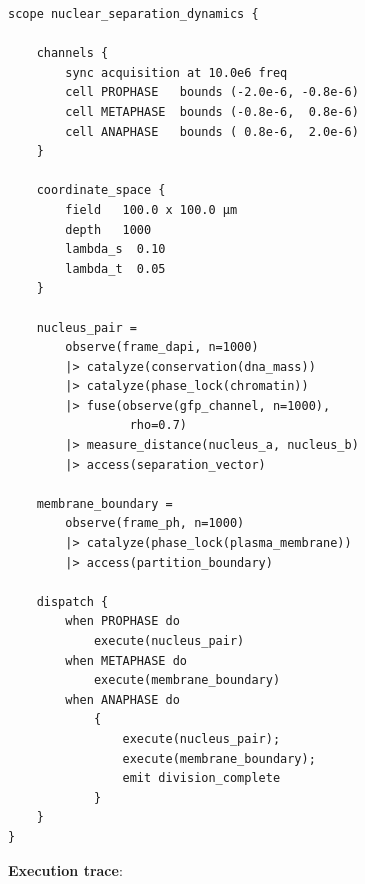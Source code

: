 \documentclass[11pt,twocolumn]{article}
\begin{document}
\begin{lstlisting}
scope nuclear_separation_dynamics {

    channels {
        sync acquisition at 10.0e6 freq
        cell PROPHASE   bounds (-2.0e-6, -0.8e-6)
        cell METAPHASE  bounds (-0.8e-6,  0.8e-6)
        cell ANAPHASE   bounds ( 0.8e-6,  2.0e-6)
    }

    coordinate_space {
        field   100.0 x 100.0 µm
        depth   1000
        lambda_s  0.10
        lambda_t  0.05
    }

    nucleus_pair =
        observe(frame_dapi, n=1000)
        |> catalyze(conservation(dna_mass))
        |> catalyze(phase_lock(chromatin))
        |> fuse(observe(gfp_channel, n=1000),
                 rho=0.7)
        |> measure_distance(nucleus_a, nucleus_b)
        |> access(separation_vector)

    membrane_boundary =
        observe(frame_ph, n=1000)
        |> catalyze(phase_lock(plasma_membrane))
        |> access(partition_boundary)

    dispatch {
        when PROPHASE do
            execute(nucleus_pair)
        when METAPHASE do
            execute(membrane_boundary)
        when ANAPHASE do
            {
                execute(nucleus_pair);
                execute(membrane_boundary);
                emit division_complete
            }
    }
}
\end{lstlisting}

\textbf{Execution trace}:
\end{document}
